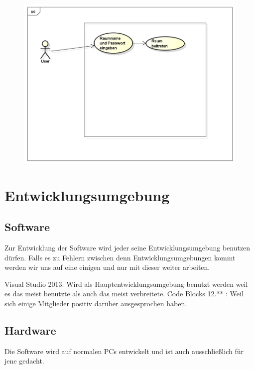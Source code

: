 \documentclass[a4paper,12pt]{scrreprt}
\begin{document}
	\begin{figure}[h]
		\centering
		\includegraphics[width=0.9\linewidth]{VPN_Raum_Beitreten}
		\caption{}
		\label{fig:VPN_Raum_Beitreten}
	\end{figure}

	
\chapter{Entwicklungsumgebung}
	
	\section{Software}
		Zur Entwicklung der Software wird jeder seine Entwicklungsumgebung benutzen dürfen. Falls es zu Fehlern zwischen denn Entwicklungsumgebungen kommt werden wir uns auf eine einigen und nur mit dieser weiter arbeiten. 
		
		Visual Studio 2013: Wird als Hauptentwicklungsumgebung benutzt werden weil es das meist benutzte als auch das meist verbreitete.  
		Code Blocks 12.** : Weil sich einige Mitglieder positiv darüber ausgesprochen haben.
		
		
		
		
	\section{Hardware}
		
		
		Die Software wird auf normalen PCs entwickelt und ist auch ausschließlich für jene gedacht.
		
		


	
	
\end{document}
